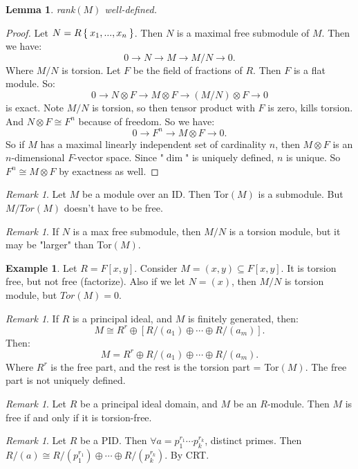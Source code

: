\documentclass[12pt]{amsbook}
\theoremstyle{plain}
\numberwithin{section}{chapter}
\numberwithin{equation}{chapter}
\newtheorem{lem}[theorem]{Lemma}
\theoremstyle{definition}
\newtheorem{Ex}[theorem]{Example}
\theoremstyle{remark}
\newtheorem{rem}[theorem]{Remark}
\newcommand{\sub}{\subseteq}
\newcommand{\tens}{\otimes}
\begin{document}
\begin{lem}
rank$(M)$ well-defined. 
\end{lem}
\begin{proof}

Let $N = R\Set{x_1,...,x_n}$. Then $N$ is a maximal free submodule of $M$. Then we have:
$$
0 \to N \to M \to M/N \to 0.
$$
Where $M/N$ is torsion. Let $F$ be the field of fractions of $R$. Then $F$ is a flat module. So:
$$
0 \to N \tens F \to M \tens F \to (M/N) \tens F \to 0
$$
is exact. Note $M/N$ is torsion, so then tensor product with $F$ is zero, kills torsion. And $N \tens F \cong F^n$ because of freedom. 
So we have:
$$
0 \to F^n \to M \tens F \to 0.
$$
So if $M$ has a maximal linearly independent set of cardinality $n$, then $M \tens F$ is an $n$-dimensional $F$-vector space. Since "$\dim$" is uniquely defined, $n$ is unique. So $F^n \cong M \tens F$ by exactness as well. 
\end{proof}


\begin{rem}
Let $M$ be a module over an ID. Then Tor$(M)$ is a submodule. But $M/Tor(M)$ doesn't have to be free. 
\end{rem}

\begin{rem}
If $N$ is a max free submodule, then $M/N$ is a torsion module, but it may be "larger" than Tor$(M)$. 
\end{rem}

\begin{Ex}
Let $R = F[x,y]$. Consider $M = (x,y) \sub F[x,y]$. It is torsion free, but not free (factorize). Also if we let $N = (x)$, then $M/N$ is torsion module, but $Tor(M) = 0$. 
\end{Ex}

\begin{rem}
If $R$ is a principal ideal, and $M$ is finitely generated, then:
 $$
 M \cong R^r \oplus [R/(a_1) \oplus \cdots \oplus R/(a_m)].
 $$
 Then:
 $$
 M = R^r \oplus R/(a_1) \oplus \cdots \oplus R/(a_m).
 $$
 Where $R^r$ is the free part, and the rest is the torsion part = Tor$(M)$. The free part is not uniquely defined. 
\end{rem}

\begin{rem}
Let $R$ be a principal ideal domain, and $M$ be an $R$-module. Then $M$ is free if and only if it is torsion-free. 
\end{rem} 

\begin{rem}
Let $R$ be a PID. Then $\forall a = p_1^{r_1}\cdots p_k^{r_k}$, distinct primes. Then $R/(a) \cong R/(p_1^{r_1}) \oplus \cdots \oplus R/(p_k^{r_k})$. By CRT.
\end{rem}
\end{document}
